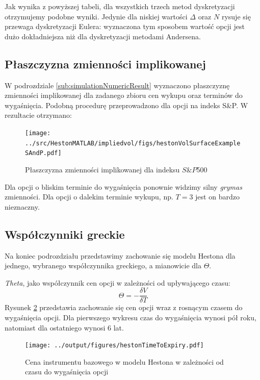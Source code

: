 \documentclass{pracamgr}
\begin{document}
Jak wynika z powyższej tabeli, dla wszystkich trzech metod dyskretyzacji 
otrzymujemy podobne wyniki. Jedynie dla niskiej wartości $\Delta$ oraz $N$ rysuje się 
przewaga dyskretyzacji Eulera: wyznaczona tym sposobem wartość opcji jest dużo
dokładniejsza niż dla dyskretyzacji metodami Andersena.



\subsection{Płaszczyzna zmienności implikowanej}

W podrozdziale \ref{sub:simulationNumericResult} wyznaczono płaszczyznę
zmienności implikowanej dla zadanego zbioru cen wykupu oraz terminów do wygaśnięcia. 
Podobną procedurę przeprowadzono dla opcji na indeks
S\&P. W rezultacie otrzymano:

\begin{figure}[ht!]
  \centering
  \texttt{[image: ../src/HestonMATLAB/impliedvol/figs/hestonVolSurfaceExampleSAndP.pdf]}
  \caption{Płaszczyzna zmienności implikowanej dla indeksu $S\&P$500}
  \label{fig:volatilitySurface}
\end{figure}
Dla opcji o bliskim terminie do wygaśnięcia ponownie widzimy silny \textit{grymas} 
zmienności. Dla opcji o dalekim terminie wykupu, np. $T=3$ jest on 
bardzo nieznaczny.

\subsection{Współczynniki greckie}

Na koniec podrozdziału przedstawimy zachowanie się modelu Hestona dla jednego, wybranego współczynnika 
greckiego, a mianowicie dla $\Theta$.

\textit{Theta}, jako współczynnik cen opcji w zależności od upływającego czasu:
\begin{equation}
  \Theta = - \frac{\delta V}{\delta T}
\end{equation}
Rysunek \ref{fig:hestonTimeToExpiry} przedstawia zachowanie się cen opcji wraz z rosnącym czasem do 
wygaśnięcia opcji. Dla pierwszego wykresu czas do wygaśnięcia wynosi pół roku, natomiast dla 
ostatniego wynosi 6 lat. 

\begin{figure}[ht!]
  \texttt{[image: ../output/figures/hestonTimeToExpiry.pdf]}
  \caption{Cena instrumentu bazowego w modelu Hestona w zależności od czasu do wygaśnięcia opcji}
  \label{fig:hestonTimeToExpiry}
\end{figure}
\end{document}
